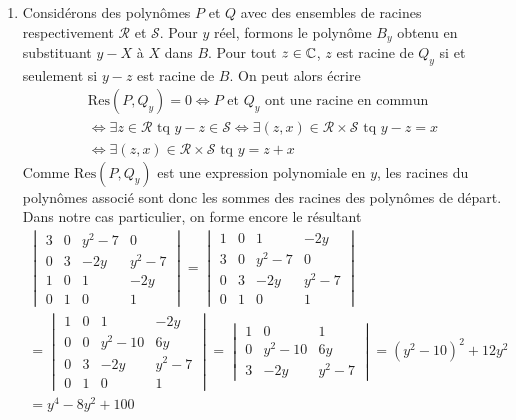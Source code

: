 \begin{enumerate}
 \item Considérons des polynômes $P$ et $Q$ avec des ensembles de racines respectivement $\mathcal{R}$ et $\mathcal{S}$. Pour $y$ réel, formons le polynôme $B_y $ obtenu en substituant $y-X$ à $X$ dans $B$.\newline
Pour tout $z\in\mathbb{C}$, $z$ est racine de $Q_y$ si et seulement si $y-z$ est racine de $B$.\newline
On peut alors écrire
\begin{multline*}
\text{Res}(P,Q_y)=0 \Leftrightarrow
 P \text{ et } Q_y\text{ ont une racine en commun} \\
\Leftrightarrow \exists z\in \mathcal{R} \text{ tq } y-z \in \mathcal{S} 
\Leftrightarrow \exists (z,x)\in \mathcal{R}\times\mathcal{S} \text{ tq } y-z = x  \\
\Leftrightarrow \exists (z,x)\in \mathcal{R}\times\mathcal{S} \text{ tq } y = z + x 
\end{multline*}
Comme $\text{Res}(P,Q_y)$ est une expression polynomiale en $y$, les racines du polynômes associé sont donc les sommes des racines des polynômes de départ.\newline
Dans notre cas particulier, on forme encore le résultant
\begin{multline*}
\begin{vmatrix}
3 & 0 & y^2-7 & 0     \\
0 & 3 & -2y   & y^2-7 \\
1 & 0 & 1     & -2y   \\
0 & 1 & 0     &  1
\end{vmatrix}
=
\begin{vmatrix}
1 & 0 & 1     & -2y   \\
3 & 0 & y^2-7 & 0     \\
0 & 3 & -2y   & y^2-7 \\
0 & 1 & 0     &  1
\end{vmatrix} \\
=
\begin{vmatrix}
1 & 0 & 1      & -2y   \\
0 & 0 & y^2-10 & 6y    \\
0 & 3 & -2y    & y^2-7 \\
0 & 1 & 0      &  1
\end{vmatrix}
=
\begin{vmatrix}
1 & 0      &  1    \\
0 & y^2-10 & 6y    \\
3 & -2y    & y^2-7 
\end{vmatrix}
= (y^2-10)^2 + 12 y^2 \\
= y^4 -8y^2 + 100
\end{multline*}

\end{enumerate}
